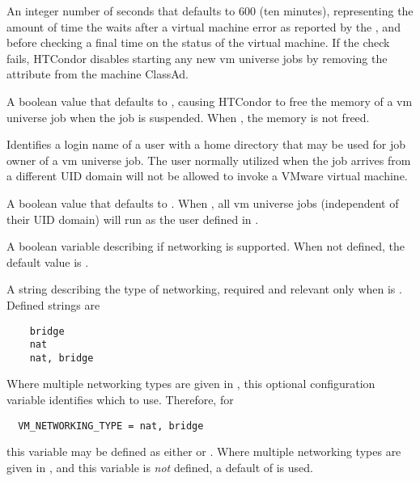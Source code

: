 \begin{description}
\label{param:VMRecheckInterval}
\item[\Macro{VM\_RECHECK\_INTERVAL}]
  An integer number of seconds that defaults to 600 (ten minutes),
  representing the amount of time the  waits after a
  virtual machine error as reported by the ,
  and before checking a final time on the status of the virtual machine.
  If the check fails, HTCondor disables starting any new vm universe jobs
  by removing the  attribute from the machine ClassAd.

\label{param:VMSoftSuspend}
\item[\Macro{VM\_SOFT\_SUSPEND}]
  A boolean value that defaults to ,
  causing HTCondor to free the memory of a vm universe job when
  the job is suspended.
  When , the memory is not freed.

\label{param:VMUnivNobodyUser}
\item[\Macro{VM\_UNIV\_NOBODY\_USER}]
  Identifies a login name of a user with a home directory that
  may be used for job owner of a vm universe job.
  The  user normally utilized when the job arrives
  from a different UID domain will not be allowed to invoke a VMware
  virtual machine.

\label{param:AlwaysVMUnivUseNobody}
\item[\Macro{ALWAYS\_VM\_UNIV\_USE\_NOBODY}]
  A boolean value that defaults to .
  When , all vm universe jobs (independent of their
  UID domain) will run as the user defined in .

\label{param:VMNetworking}
\item[\Macro{VM\_NETWORKING}]
  A boolean variable describing if networking is supported.
  When not defined, the default value is .

\label{param:VMNetworkingType}
\item[\Macro{VM\_NETWORKING\_TYPE}]
  A string describing the type of networking,
  required and relevant only when  is .
  Defined strings are
  \begin{verbatim}
    bridge
    nat
    nat, bridge
  \end{verbatim}

\label{param:VMNetworkingDefaultType}
\item[\Macro{VM\_NETWORKING\_DEFAULT\_TYPE}]
  Where multiple networking types are given in ,
  this optional configuration variable identifies which to use.
  Therefore, for 
  \begin{verbatim}
  VM_NETWORKING_TYPE = nat, bridge
  \end{verbatim}
  this variable may be defined as either  or .
  Where multiple networking types are given in ,
  and this variable is \emph{not} defined, a default of 
  is used.


\end{description}
